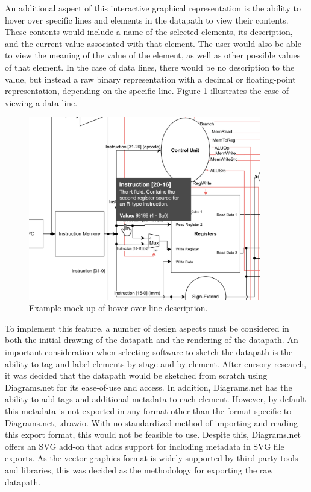 \documentclass[
    paper=letter,
    parskip=half,
    fontsize=12pt,
    titlepage=firstiscover,
    toc=bibliography,
    numbers=endperiod
]{scrartcl}
\begin{document}
An additional aspect of this interactive graphical representation is the
ability to hover over specific lines and elements in the datapath to
view their contents. These contents would include a name of the selected
elements, its description, and the current value associated with that
element. The user would also be able to view the meaning of the value of
the element, as well as other possible values of that element. In the
case of data lines, there would be no description to the value, but
instead a raw binary representation with a decimal or floating-point
representation, depending on the specific line. Figure
\ref{fig:hover-over-mockup} illustrates the case of viewing a data line.

\begin{figure}[H]
    \includegraphics[height=8cm]{hover-over-mockup}
    \caption{Example mock-up of hover-over line description.}
    \label{fig:hover-over-mockup}
\end{figure}

To implement this feature, a number of design aspects must be considered
in both the initial drawing of the datapath and the rendering of the
datapath. An important consideration when selecting software to sketch
the datapath is the ability to tag and label elements by stage and by
element. After cursory research, it was decided that the datapath would
be sketched from scratch using Diagrams.net for its ease-of-use and
access. In addition, Diagrams.net has the ability to add tags and
additional metadata to each element. However, by default this metadata
is not exported in any format other than the format specific to
Diagrams.net, .drawio. With no standardized method of importing and
reading this export format, this would not be feasible to use. Despite
this, Diagrams.net offers an SVG add-on that adds support for including
metadata in SVG file exports. As the vector graphics format is
widely-supported by third-party tools and libraries, this was decided as
the methodology for exporting the raw datapath.
\end{document}
